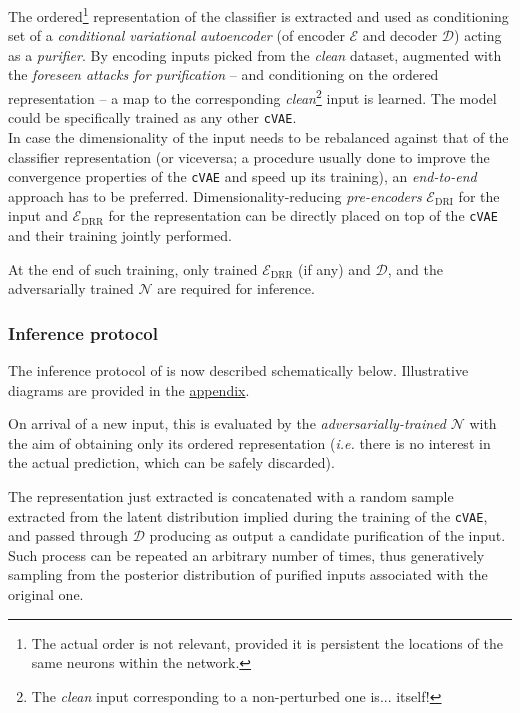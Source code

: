 The ordered\footnote{The actual order is not relevant, provided it is persistent \wrt the locations of the same neurons within the network.} representation of the classifier is extracted and used as conditioning set of a \textit{conditional variational autoencoder} (of encoder $\mathcal{E}$ and decoder $\mathcal{D}$) acting as a \textit{purifier}. By encoding inputs picked from the \textit{clean} dataset, augmented with the \textit{foreseen attacks for purification} -- and conditioning on the ordered representation -- a map to the corresponding \textit{clean}\footnote{The \textit{clean} input corresponding to a non-perturbed one is... itself!} input is learned. The model could be specifically trained as any other \texttt{cVAE}.\\
In case the dimensionality of the input needs to be rebalanced against that of the classifier representation (or viceversa; a procedure usually done to improve the convergence properties of the \texttt{cVAE} and speed up its training), an \textit{end-to-end} approach has to be preferred. Dimensionality-reducing \textit{pre-encoders} $\mathcal{E}_{\text{DRI}}$ for the input and $\mathcal{E}_{\text{DRR}}$ for the representation can be directly placed on top of the \texttt{cVAE} and their training jointly performed.

At the end of such training, only trained $\mathcal{E}_{\text{DRR}}$ (if any) and $\mathcal{D}$, and the adversarially trained $\mathcal{N}$ are required for inference.

\subsubsection{Inference protocol}
The inference protocol of \carso is now described schematically below. Illustrative diagrams are provided in the \hyperref[sec:appendix]{appendix}.

On arrival of a new input, this is evaluated by the \textit{adversarially-trained} $\mathcal{N}$ with the aim of obtaining only its ordered representation (\textit{i.e.} there is no interest in the actual prediction, which can be safely discarded).

The representation just extracted is concatenated with a random sample extracted from the latent distribution implied during the training of the \texttt{cVAE}, and passed through $\mathcal{D}$ producing as output a candidate purification of the input. Such process can be repeated an arbitrary number of times, thus generatively sampling from the posterior distribution of purified inputs associated with the original one.

